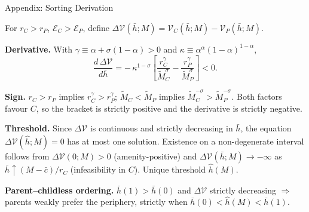 \documentclass[11pt,aspectratio=169]{beamer}
\begin{document}
\begin{frame}{Appendix: Sorting Derivation \; \hyperlink{slide1-main}{}}
\label{app:sorting}
\small

For $r_C > r_P$, $\mathcal E_C > \mathcal E_P$, define
$\Delta\mathcal V(\bar h;M)=\mathcal V_C(\bar h;M)-\mathcal V_P(\bar h;M)$.

\vspace{0.4em}
\textbf{Derivative.} With $\gamma \equiv \alpha + \sigma(1-\alpha) > 0$ and
$\kappa \equiv \alpha^\alpha (1-\alpha)^{1-\alpha}$,
\[
\frac{d\,\Delta\mathcal V}{d\bar h}
= -\,\kappa^{1-\sigma}\!\left[\frac{r_C^{\gamma}}{\tilde M_C^{\sigma}}
  - \frac{r_P^{\gamma}}{\tilde M_P^{\sigma}}\right] < 0.
\]

\vspace{0.3em}
\textbf{Sign.} $r_C > r_P$ implies $r_C^\gamma > r_P^\gamma$;
$\tilde M_C < \tilde M_P$ implies $\tilde M_C^{-\sigma} > \tilde M_P^{-\sigma}$.
Both factors favour $C$, so the bracket is strictly positive and the
derivative is strictly negative.

\vspace{0.4em}
\textbf{Threshold.} Since $\Delta\mathcal V$ is continuous and strictly
decreasing in $\bar h$, the equation $\Delta\mathcal V(\hat h;M) = 0$
has at most one solution. Existence on a non-degenerate interval
follows from $\Delta\mathcal V(0;M)>0$ (amenity-positive) and
$\Delta\mathcal V(\bar h;M)\to-\infty$
as $\bar h \uparrow (M-\bar c)/r_C$ (infeasibility in $C$). Unique
threshold $\hat h(M)$.

\vspace{0.4em}
\textbf{Parent--childless ordering.} $\bar h(1) > \bar h(0)$ and $\Delta\mathcal V$
strictly decreasing $\Rightarrow$ parents weakly prefer the periphery,
strictly when $\bar h(0) < \hat h(M) < \bar h(1)$.
\end{frame}
\end{document}
